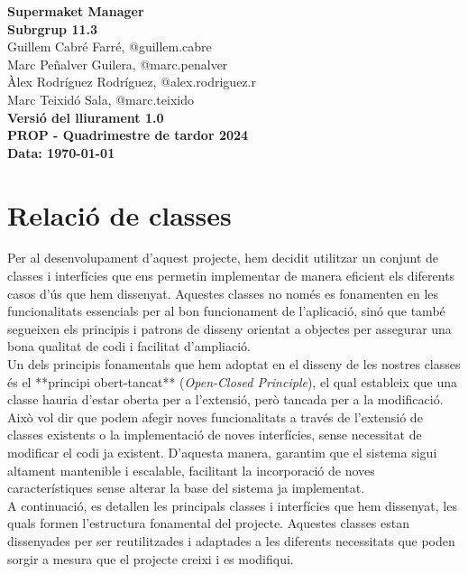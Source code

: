 \documentclass[a4paper,12pt]{report}
\newcommand{\titolPractica}{Supermaket Manager}
\newcommand{\identificadorEquip}{Subrgrup 11.3}
\newcommand{\PROPquatrimestre}{PROP - Quadrimestre de tardor 2024}
\newcommand{\versioLliurament}{Versió del lliurament 1.0}
\begin{document}
	\begin{titlepage}
		\begin{center}
			{\Large \textbf{\titolPractica}} \\[10cm]
			\textbf{\large \identificadorEquip} \\[1cm]
			Guillem Cabré Farré, \small{@guillem.cabre} \\
			Marc Peñalver Guilera, \small{@marc.penalver} \\
			Àlex Rodríguez Rodríguez, \small{@alex.rodriguez.r} \\
			Marc Teixidó Sala, \small{@marc.teixido} \\[2cm]
			\textbf{\versioLliurament} \\
			\textbf{\PROPquatrimestre} \\
			\textbf{Data: \today}
		\end{center}
	\end{titlepage}

	\tableofcontents
	\clearpage

	\chapter{Relació de classes}

	Per al desenvolupament d'aquest projecte, hem decidit utilitzar un conjunt de classes i interfícies que ens permetin implementar de manera eficient els diferents casos d'ús que hem dissenyat. Aquestes classes no només es fonamenten en les funcionalitats essencials per al bon funcionament de l'aplicació, sinó que també segueixen els principis i patrons de disseny orientat a objectes per assegurar una bona qualitat de codi i facilitat d'ampliació. \\

	Un dels principis fonamentals que hem adoptat en el disseny de les nostres classes és el **principi obert-tancat** (\textit{Open-Closed Principle}), el qual estableix que una classe hauria d'estar oberta per a l'extensió, però tancada per a la modificació. Això vol dir que podem afegir noves funcionalitats a través de l'extensió de classes existents o la implementació de noves interfícies, sense necessitat de modificar el codi ja existent. D'aquesta manera, garantim que el sistema sigui altament mantenible i escalable, facilitant la incorporació de noves característiques sense alterar la base del sistema ja implementat.\\

	A continuació, es detallen les principals classes i interfícies que hem dissenyat, les quals formen l'estructura fonamental del projecte. Aquestes classes estan dissenyades per ser reutilitzades i adaptades a les diferents necessitats que poden sorgir a mesura que el projecte creixi i es modifiqui.
\end{document}
